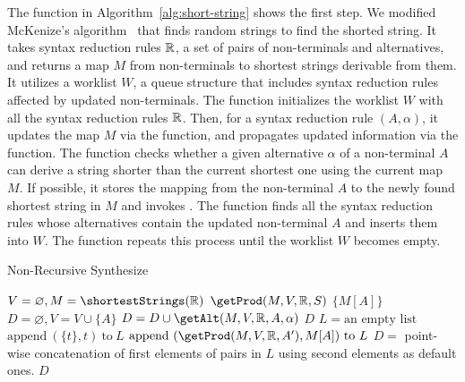 The  function in Algorithm~\ref{alg:short-string} shows the first step.
We modified McKenize's algorithm~\cite{cfg-gen} that finds random
strings to find the shorted string.  It takes syntax reduction rules
$\mathbb{R}$, a set of pairs of non-terminals and alternatives, and
returns a map $M$ from non-terminals to shortest strings derivable from them.
It utilizes a worklist $W$, a queue structure that includes syntax reduction rules
affected by updated non-terminals.
The function initializes the worklist $W$ with all the syntax reduction rules $\mathbb{R}$.
Then, for a syntax reduction rule $(A, \alpha)$, it updates the
map $M$ via the  function, and propagates updated
information via the  function.
The  function checks whether a given alternative $\alpha$ of
a non-terminal $A$ can derive a string shorter than the current
shortest one using the current map $M$.
If possible, it stores the mapping from the non-terminal $A$ to the
newly found shortest string in $M$ and invokes .
The  function finds all the syntax reduction rules
whose alternatives contain the updated non-terminal $A$ 
and inserts them into $W$.  The  function
repeats this process until the worklist $W$ becomes empty.

\begin{algorithm}[t]
  \caption{Non-Recursive Synthesize}
  \label{alg:non-rec-synthesize}
  \DontPrintSemicolon
   {
    $V = \varnothing, M = \shortestStrings(\ruleset)$\;
    \Return $\getProd(M, V, \ruleset, S)$\;
  }
   {
     {
      \Return $\{ M[A] \}$
    }
    $D = \varnothing, V = V \cup \{ A \}$\;
     {
      $D = D \cup \getAlt(M, V, \ruleset, A, \alpha)$\;
    }
    \Return $D$\;
  }
   {
    $L = \text{an empty list}$\;
     {
       {
        $\text{append}\ (\{ t \}, t)\ \text{to}\ L$\;
      }
       {
        $\text{append}\ (\getProd(M, V, \ruleset, A'), M[A])\ \text{to}\ L$}
    }
    $D =$ point-wise concatenation of first elements of pairs in $L$ using
    second elements as default ones.\;
    \Return $D$\;
  }
\end{algorithm}

